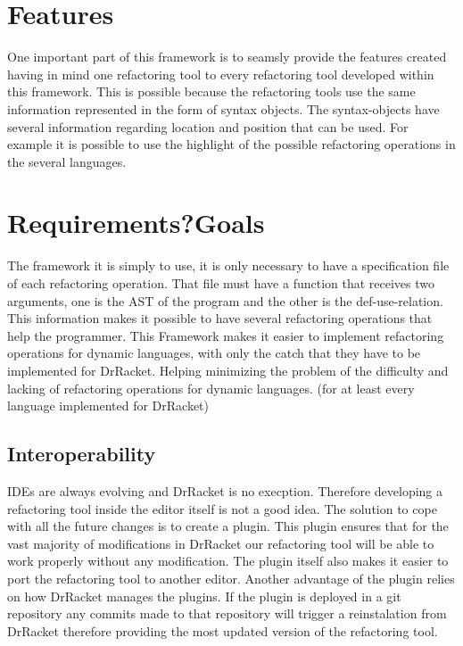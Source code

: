 \section{Features} %
One important part of this framework is to seamsly provide the features created
having in mind one refactoring tool to every refactoring tool developed within this
framework.
This is possible because the refactoring tools use the same information represented
in the form of syntax objects. The syntax-objects have several information regarding
location and position that can be used.
For example it is possible to use the highlight of the possible refactoring operations
in the several languages.
\section{Requirements?Goals}
The framework it is simply to use, it is only necessary to have a specification file
of each refactoring operation.
That file must have a function that receives two arguments,
one is the AST of the program and the other is the def-use-relation.
This information makes it possible to have several refactoring operations that help
the programmer.
This Framework makes it easier to implement refactoring operations for dynamic languages,
with only the catch that they have to be implemented for DrRacket. Helping minimizing
the problem of the difficulty and lacking of refactoring operations for dynamic languages.
(for at least every language implemented for DrRacket)




\subsection{Interoperability} %

IDEs are always evolving and DrRacket is no execption. Therefore developing a refactoring tool
inside the editor itself is not a good idea. The solution to cope with all the future changes
is to create a plugin. This plugin ensures that for the vast majority of modifications in DrRacket
our refactoring tool will be able to work properly without any modification.
The plugin itself also makes it easier to port the refactoring tool to another editor.
Another advantage of the plugin relies on how DrRacket manages the plugins. If the plugin
is deployed in a git repository any commits made to that repository will trigger
a reinstalation from DrRacket therefore providing the most updated version of the refactoring tool.

